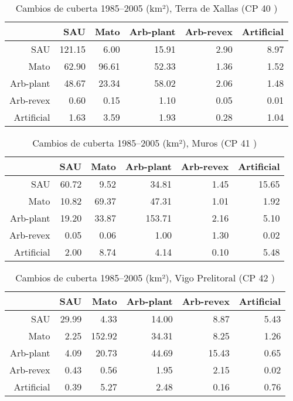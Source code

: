 \begin{table}[p]
\centering
\caption{Cambios de cuberta 1985--2005 (km²), Terra de Xallas (CP 40 )} 
\label{TaboaContinxCP40}
\begin{tabular}{rrrrrr}
  \hline
 & SAU & Mato & Arb-plant & Arb-revex & Artificial \\ 
  \hline
SAU & 121.15 & 6.00 & 15.91 & 2.90 & 8.97 \\ 
  Mato & 62.90 & 96.61 & 52.33 & 1.36 & 1.52 \\ 
  Arb-plant & 48.67 & 23.34 & 58.02 & 2.06 & 1.48 \\ 
  Arb-revex & 0.60 & 0.15 & 1.10 & 0.05 & 0.01 \\ 
  Artificial & 1.63 & 3.59 & 1.93 & 0.28 & 1.04 \\ 
   \hline
\end{tabular}
\end{table}
\begin{table}[p]
\centering
\caption{Cambios de cuberta 1985--2005 (km²), Muros (CP 41 )} 
\label{TaboaContinxCP41}
\begin{tabular}{rrrrrr}
  \hline
 & SAU & Mato & Arb-plant & Arb-revex & Artificial \\ 
  \hline
SAU & 60.72 & 9.52 & 34.81 & 1.45 & 15.65 \\ 
  Mato & 10.82 & 69.37 & 47.31 & 1.01 & 1.92 \\ 
  Arb-plant & 19.20 & 33.87 & 153.71 & 2.16 & 5.10 \\ 
  Arb-revex & 0.05 & 0.06 & 1.00 & 1.30 & 0.02 \\ 
  Artificial & 2.00 & 8.74 & 4.14 & 0.10 & 5.48 \\ 
   \hline
\end{tabular}
\end{table}
\begin{table}[p]
\centering
\caption{Cambios de cuberta 1985--2005 (km²), Vigo Prelitoral (CP 42 )} 
\label{TaboaContinxCP42}
\begin{tabular}{rrrrrr}
  \hline
 & SAU & Mato & Arb-plant & Arb-revex & Artificial \\ 
  \hline
SAU & 29.99 & 4.33 & 14.00 & 8.87 & 5.43 \\ 
  Mato & 2.25 & 152.92 & 34.31 & 8.25 & 1.26 \\ 
  Arb-plant & 4.09 & 20.73 & 44.69 & 15.43 & 0.65 \\ 
  Arb-revex & 0.43 & 0.56 & 1.95 & 2.15 & 0.02 \\ 
  Artificial & 0.39 & 5.27 & 2.48 & 0.16 & 0.76 \\ 
   \hline
\end{tabular}
\end{table}
